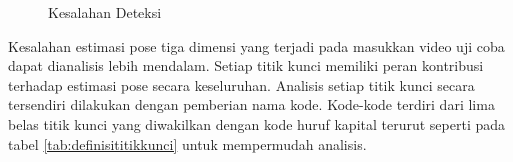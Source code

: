 \begin{figure}[htbp]
    \begin{center}
    \end{center}
    \vspace{-20pt}
    \captionsetup{labelfont=bf, textfont=bf}
    \caption{Kesalahan Deteksi}
    \vspace{-10pt}
    \captionsetup{labelfont=md, textfont=md}
    \label{fig:bro131}
\end{figure}

\pagebreak

Kesalahan estimasi pose tiga dimensi yang terjadi pada masukkan video uji coba dapat dianalisis
lebih mendalam.
Setiap titik kunci memiliki peran kontribusi terhadap estimasi pose secara keseluruhan. Analisis
setiap titik kunci secara tersendiri dilakukan dengan
pemberian nama kode.
Kode-kode terdiri dari lima belas titik kunci yang diwakilkan dengan kode huruf kapital terurut seperti pada
tabel \ref{tab:definisititikkunci} untuk mempermudah analisis.

